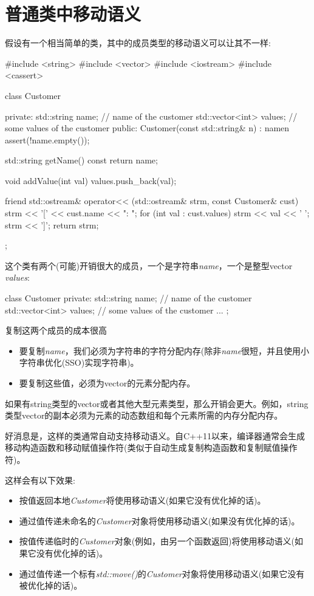 \section{普通类中移动语义}
假设有一个相当简单的类，其中的成员类型的移动语义可以让其不一样:

\begin{cppcode}
#include <string>
#include <vector>
#include <iostream>
#include <cassert>

class Customer {
private:
	std::string name; // name of the customer
	std::vector<int> values; // some values of the customer
public:
	Customer(const std::string& n)
	: name{n} {
		assert(!name.empty());
	}

	std::string getName() const {
		return name;
	}

	void addValue(int val) {
		values.push_back(val);
	}

	friend std::ostream& operator<< (std::ostream& strm, const Customer& cust) {
		strm << '[' << cust.name << ": ";
		for (int val : cust.values) {
			strm << val << ' ';
		}
		strm << ']';
		return strm;
	}
};
\end{cppcode}

这个类有两个(可能)开销很大的成员，一个是字符串\textit{name}，一个是整型vector \textit{values}:

\begin{cppcode}
class Customer {
private:
	std::string name; // name of the customer
	std::vector<int> values; // some values of the customer
	...
};
\end{cppcode}

复制这两个成员的成本很高

\begin{itemize}
	\item 要复制\textit{name}，我们必须为字符串的字符分配内存(除非\textit{name}很短，并且使用小字符串优化(SSO)实现字符串)。
	\item 要复制这些值，必须为vector的元素分配内存。
\end{itemize}

如果有string类型的vector或者其他大型元素类型，那么开销会更大。例如，string类型vector的副本必须为元素的动态数组和每个元素所需的内存分配内存。

好消息是，这样的类通常自动支持移动语义。自C++11以来，编译器通常会生成移动构造函数和移动赋值操作符(类似于自动生成复制构造函数和复制赋值操作符)。

这样会有以下效果:

\begin{itemize}
	\item 按值返回本地\textit{Customer}将使用移动语义(如果它没有优化掉的话)。
	\item 通过值传递未命名的\textit{Customer}对象将使用移动语义(如果没有优化掉的话)。
	\item 按值传递临时的\textit{Customer}对象(例如，由另一个函数返回)将使用移动语义(如果它没有优化掉的话)。
	\item 通过值传递一个标有\textit{std::move()}的\textit{Customer}对象将使用移动语义(如果它没有被优化掉的话)。
\end{itemize}

